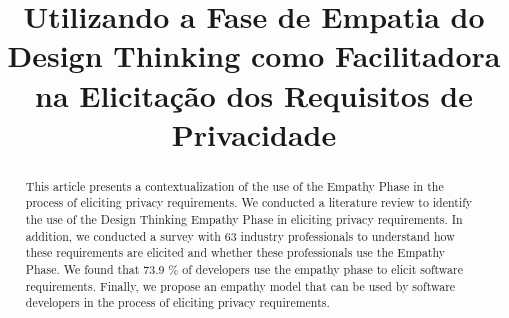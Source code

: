 \documentclass[conference]{IEEEtran}
\begin{document}
\title{Utilizando a Fase de Empatia do Design Thinking como Facilitadora na Elicitação dos Requisitos de Privacidade
}
\author{
\and
{}
\and

}
\maketitle

\begin{abstract}

This article presents a contextualization of the use of the Empathy Phase in the process of eliciting privacy requirements. We conducted a literature review to identify the use of the Design Thinking Empathy Phase in eliciting privacy requirements. In addition, we conducted a survey with 63 industry professionals to understand how these requirements are elicited and whether these professionals use the Empathy Phase. We found that 73.9 \% of developers use the empathy phase to elicit software requirements. Finally, we propose an empathy model that can be used by software developers in the process of eliciting privacy requirements.

\end{abstract}
\IEEEpeerreviewmaketitle
\end{document}

